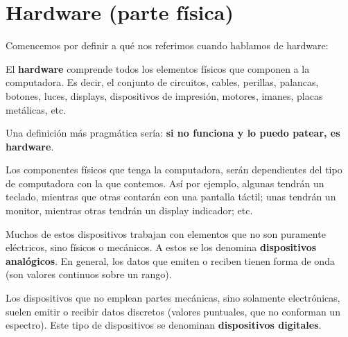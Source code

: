 \section{Hardware (parte física)}
\label{chap:computadoras:sec:hardware}

Comencemos por definir a qué nos referimos cuando hablamos de hardware:

\begin{definition}
    El \textbf{hardware} comprende todos los elementos físicos que componen a la
    computadora. Es decir, el conjunto de circuitos, cables, perillas, palancas,
    botones, luces, displays, dispositivos de impresión, motores, imanes, placas
    metálicas, etc.\autocite[vid. p.12]{gookin_2005}
\end{definition}

Una definición más pragmática sería: \textbf{si no funciona y lo puedo patear,
es hardware}.

Los componentes físicos que tenga la computadora, serán dependientes del tipo de
computadora con la que contemos. Así por ejemplo, algunas tendrán un teclado,
mientras que otras contarán con una pantalla táctil; unas tendrán un monitor,
mientras otras tendrán un display indicador; etc.

Muchos de estos dispositivos trabajan con elementos que no son puramente
eléctricos, sino físicos o mecánicos. A estos se los denomina
\textbf{dispositivos analógicos}. En general, los datos que emiten o reciben
tienen forma de onda (son valores continuos sobre un rango).

Los dispositivos que no emplean partes mecánicas, sino solamente electrónicas,
suelen emitir o recibir datos discretos (valores puntuales, que no conforman un
espectro). Este tipo de dispositivos se denominan \textbf{dispositivos
digitales}.


